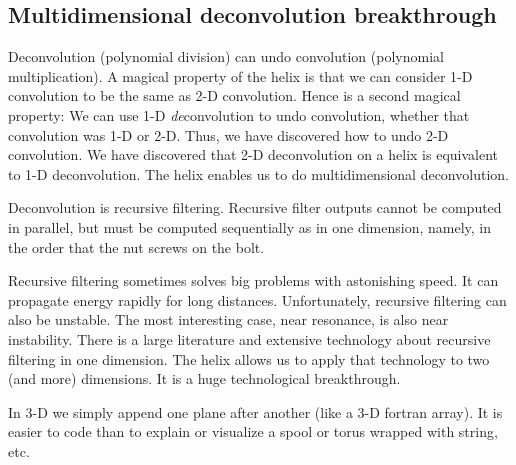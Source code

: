 \subsection{Multidimensional deconvolution breakthrough}
Deconvolution (polynomial division)
can undo convolution (polynomial multiplication).
A magical property of the helix is that we can consider
1-D convolution to be the same as 2-D convolution.
Hence is a second magical property:
We can use 1-D
 {\em  de}convolution to undo convolution,
whether that convolution was 1-D or 2-D.
Thus, we have discovered how to undo 2-D convolution.
We have discovered that 2-D deconvolution on a helix
is equivalent to        1-D deconvolution.
The helix enables us to do multidimensional deconvolution.
\par
Deconvolution is recursive filtering.
Recursive filter outputs cannot be computed in parallel,
but must be computed sequentially
as in one dimension, namely,
in the order that the nut
screws on the bolt.  
\par
Recursive filtering sometimes solves big problems with astonishing speed.
It can propagate energy rapidly for long distances.
Unfortunately, recursive filtering can also be unstable.
The most interesting case, near resonance, is also near instability.
There is a large literature and extensive technology
about recursive filtering in one dimension.
The helix allows us to apply that technology to two (and more) dimensions.
It is a huge technological breakthrough.
\par
In 3-D we simply append one plane after
another (like a 3-D fortran array).
It is easier to code than to explain or visualize
a spool or torus wrapped with string, etc.



